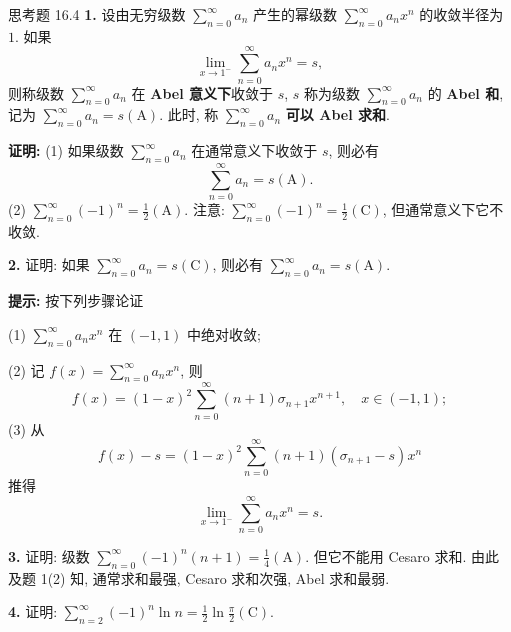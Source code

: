 \begin{exblock}{思考题 16.4}
\textbf{1.} 设由无穷级数 $\displaystyle\sum_{n=0}^{\infty}a_{n}$ 产生的幂级数 $\displaystyle\sum_{n=0}^{\infty}a_{n}x^{n}$ 的收敛半径为 $1$. 如果
\[
  \lim_{x\to1^{-}}\sum_{n=0}^{\infty}a_{n}x^{n}=s,
\]
则称级数 $\displaystyle\sum_{n=0}^{\infty}a_{n}$ 在 \textbf{Abel 意义下}收敛于 $s$, $s$ 称为级数 $\displaystyle\sum_{n=0}^{\infty}a_{n}$ 的 \textbf{Abel 和}, 记为 $\displaystyle\sum_{n=0}^{\infty}a_{n}=s(\mathrm{A})$. 此时, 称 $\displaystyle\sum_{n=0}^{\infty}a_{n}$ \textbf{可以 Abel 求和}.

\textbf{证明:} (1) 如果级数 $\displaystyle\sum_{n=0}^{\infty}a_{n}$ 在通常意义下收敛于 $s$, 则必有
\[
  \sum_{n=0}^{\infty}a_{n}=s(\mathrm{A}).
\]
(2) $\displaystyle\sum_{n=0}^{\infty}(-1)^{n}=\frac{1}{2}(\mathrm{A})$. 注意: $\displaystyle\sum_{n=0}^{\infty}(-1)^{n}=\frac{1}{2}(\mathrm{C})$, 但通常意义下它不收敛.

\textbf{2.} 证明: 如果 $\displaystyle\sum_{n=0}^{\infty}a_{n}=s(\mathrm{C})$, 则必有 $\displaystyle\sum_{n=0}^{\infty}a_{n}=s(\mathrm{A})$.

\textbf{提示:} 按下列步骤论证

(1) $\displaystyle\sum_{n=0}^{\infty}a_{n}x^{n}$ 在 $(-1,1)$ 中绝对收敛;

(2) 记 $f(x)=\displaystyle\sum_{n=0}^{\infty}a_{n}x^{n}$, 则
\[
  f(x)=(1-x)^{2}\sum_{n=0}^{\infty}(n+1)\sigma_{n+1}x^{n+1},\quad x\in(-1,1);
\]
(3) 从
\[
  f(x)-s=(1-x)^{2}\sum_{n=0}^{\infty}(n+1)(\sigma_{n+1}-s)x^{n}
\]
推得
\[
  \lim_{x\to1^{-}}\sum_{n=0}^{\infty}a_{n}x^{n}=s.
\]

\textbf{3.} 证明: 级数 $\displaystyle\sum_{n=0}^{\infty}(-1)^{n}(n+1)=\frac{1}{4}(\mathrm{A})$. 但它不能用 Cesaro 求和. 由此及题 1(2) 知, 通常求和最强, Cesaro 求和次强, Abel 求和最弱.

\textbf{4.} 证明: $\displaystyle\sum_{n=2}^{\infty}(-1)^{n}\ln n=\frac{1}{2}\ln\frac{\pi}{2}(\mathrm{C})$.
\end{exblock}

